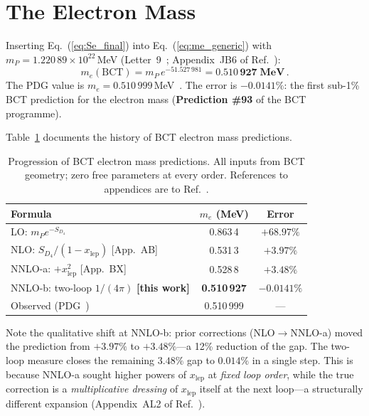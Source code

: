\documentclass[twocolumn,10pt,a4paper]{article}
\begin{document}
\section*{The Electron Mass}

Inserting Eq.~(\ref{eq:Se_final}) into Eq.~(\ref{eq:me_generic}) with
$m_P = 1.220\,89\times10^{22}$\,MeV (Letter~9~\cite{planck};
Appendix~JB6 of Ref.~\cite{monograph}):
\begin{equation}
  m_e(\mathrm{BCT}) = m_P\,e^{-51.527\,981} = \mathbf{0.510\,927}\;\mathbf{MeV}\,.
  \label{eq:me_result}
\end{equation}
The PDG value is $m_e = 0.510\,999$\,MeV~\cite{pdg}. The error is
$\mathbf{-0.0141\%}$: the first sub-1\% BCT prediction for the electron
mass (\textbf{Prediction \#93} of the BCT programme).

Table~\ref{tab:progression} documents the history of BCT electron mass
predictions.

\begin{table}[h!]
\caption{Progression of BCT electron mass predictions.
All inputs from BCT geometry; zero free parameters at every order.
References to appendices are to Ref.~\protect\cite{monograph}.}
\label{tab:progression}
\renewcommand{\arraystretch}{1.20}
\setlength{\tabcolsep}{4pt}
\begin{tabular}{@{}p{3.0cm}cc@{}}
\toprule
Formula & $m_e$ (MeV) & Error \\
\midrule
LO:\; $m_P e^{-S_{D_4}}$                       & 0.863\,4  & $+68.97\%$ \\
NLO:\; $S_{D_4}/(1{-}x_\mathrm{lep})$ [App.~AB]   & 0.531\,3  & $+3.97\%$  \\
NNLO-a:\; $+x_\mathrm{lep}^2$ [App.~BX]           & 0.528\,8  & $+3.48\%$  \\
NNLO-b:\; two-loop $1/(4\pi)$ \textbf{[this work]}  & \textbf{0.510\,927} & $\mathbf{-0.0141\%}$ \\
\midrule
Observed (PDG~\cite{pdg})                       & 0.510\,999 & --- \\
\bottomrule
\end{tabular}
\end{table}

Note the qualitative shift at NNLO-b: prior corrections (NLO$\to$NNLO-a)
moved the prediction from $+3.97\%$ to $+3.48\%$---a 12\% reduction of the
gap. The two-loop measure closes the remaining $3.48\%$ gap to $0.014\%$
in a single step. This is because NNLO-a sought higher powers of
$x_\mathrm{lep}$ at \textit{fixed loop order}, while the true correction is
a \textit{multiplicative dressing} of $x_\mathrm{lep}$ itself at the next
loop---a structurally different expansion (Appendix~AL2 of
Ref.~\cite{monograph}).
\end{document}
